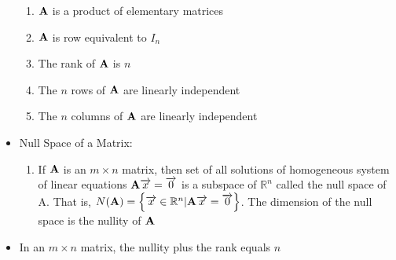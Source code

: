 \documentclass[12pt]{article}
\begin{document}
\begin{itemize}
\begin{enumerate}
      \item $\bold{A}$ is a product of elementary matrices

      \item $\bold{A}$ is row equivalent to $I_n$

      \item The rank of $\bold{A}$ is $n$

      \item The $n$ rows of $\bold{A}$ are linearly independent

      \item The $n$ columns of $\bold{A}$ are linearly independent

    \end{enumerate}

  \item Null Space of a Matrix:

    \begin{enumerate}

      \item If $\bold{A}$ is an $m\times n$ matrix, then set of all solutions of homogeneous system of linear equations $\bold{A}\overrightarrow{x}=\overrightarrow{0}$ is a subspace of $\mathbb{R}^n$ called the null space of A. That is, $N(\bold{A})=\left\{ \overrightarrow{x}\in\mathbb{R}^n | \bold{A}\overrightarrow{x}=\overrightarrow{0} \right\}$. The dimension of the null space is the nullity of $\bold{A}$

    \end{enumerate}

  \item In an $m \times n$ matrix, the nullity plus the rank equals $n$

\end{itemize}
\end{document}
